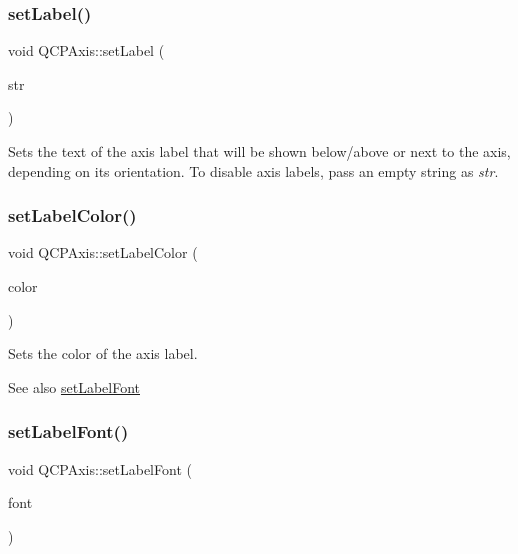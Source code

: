 \subsubsection{\texorpdfstring{set\+Label()}{setLabel()}}
{\footnotesize\ttfamily void Q\+C\+P\+Axis\+::set\+Label (\begin{DoxyParamCaption}\item[{const Q\+String \&}]{str }\end{DoxyParamCaption})}

Sets the text of the axis label that will be shown below/above or next to the axis, depending on its orientation. To disable axis labels, pass an empty string as {\itshape str}. \mbox{\label{class_q_c_p_axis_a6c906fe56d75f0122335b9f79b999608}} 
\subsubsection{\texorpdfstring{set\+Label\+Color()}{setLabelColor()}}
{\footnotesize\ttfamily void Q\+C\+P\+Axis\+::set\+Label\+Color (\begin{DoxyParamCaption}\item[{const Q\+Color \&}]{color }\end{DoxyParamCaption})}

Sets the color of the axis label.

\begin{DoxySeeAlso}{See also}
\mbox{\hyperlink{class_q_c_p_axis_a71ac1a47f7547e490a8c4311d1433cf3}{set\+Label\+Font}} 
\end{DoxySeeAlso}
\mbox{\label{class_q_c_p_axis_a71ac1a47f7547e490a8c4311d1433cf3}} 
\subsubsection{\texorpdfstring{set\+Label\+Font()}{setLabelFont()}}
{\footnotesize\ttfamily void Q\+C\+P\+Axis\+::set\+Label\+Font (\begin{DoxyParamCaption}\item[{const Q\+Font \&}]{font }\end{DoxyParamCaption})}

